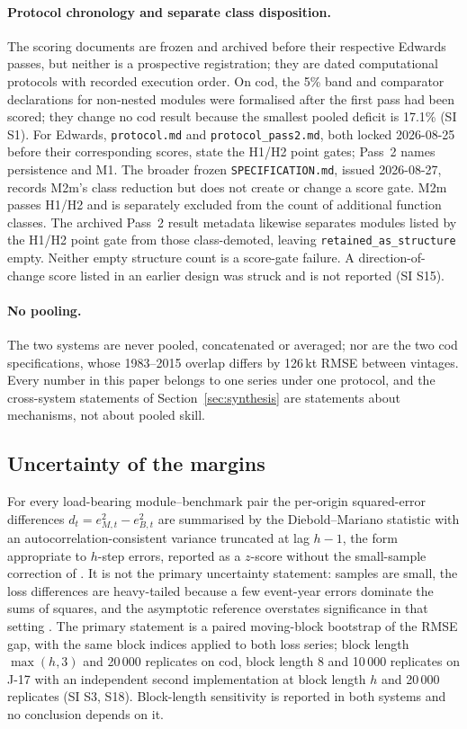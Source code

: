 \documentclass[preprint,11pt,authoryear]{elsarticle}
\theoremstyle{definition}
\theoremstyle{remark}
\begin{document}
\paragraph{Protocol chronology and separate class disposition.} The scoring documents are frozen and archived before their respective Edwards passes, but neither is a prospective registration; they are dated computational protocols with recorded execution order. On cod, the 5\% band and comparator declarations for non-nested modules were formalised after the first pass had been scored; they change no cod result because the smallest pooled deficit is 17.1\% (SI S1). For Edwards, \texttt{protocol.md} and \texttt{protocol\_pass2.md}, both locked 2026-08-25 before their corresponding scores, state the H1/H2 point gates; Pass~2 names persistence and M1. The broader frozen \texttt{SPECIFICATION.md}, issued 2026-08-27, records M2m's class reduction but does not create or change a score gate. M2m passes H1/H2 and is separately excluded from the count of additional function classes. The archived Pass~2 result metadata likewise separates modules listed by the H1/H2 point gate from those class-demoted, leaving \texttt{retained\_as\_structure} empty. Neither empty structure count is a score-gate failure. A direction-of-change score listed in an earlier design was struck and is not reported (SI S15).

\paragraph{No pooling.} The two systems are never pooled, concatenated or averaged; nor are the two cod specifications, whose 1983--2015 overlap differs by 126\,kt RMSE between vintages. Every number in this paper belongs to one series under one protocol, and the cross-system statements of Section~\ref{sec:synthesis} are statements about mechanisms, not about pooled skill.

\subsection{Uncertainty of the margins}\label{sec:uncertainty}

For every load-bearing module--benchmark pair the per-origin squared-error differences $d_t = e^2_{M,t}-e^2_{B,t}$ are summarised by the Diebold--Mariano statistic \citep{Diebold1995} with an autocorrelation-consistent variance truncated at lag $h-1$, the form appropriate to $h$-step errors, reported as a $z$-score without the small-sample correction of \citet{Harvey1997}. It is not the primary uncertainty statement: samples are small, the loss differences are heavy-tailed because a few event-year errors dominate the sums of squares, and the asymptotic reference overstates significance in that setting \citep{Diebold2015}. The primary statement is a paired moving-block bootstrap \citep{Kunsch1989} of the RMSE gap, with the same block indices applied to both loss series; block length $\max(h,3)$ and 20\,000 replicates on cod, block length 8 and 10\,000 replicates on J-17 with an independent second implementation at block length $h$ and 20\,000 replicates (SI S3, S18). Block-length sensitivity is reported in both systems and no conclusion depends on it.
\end{document}
